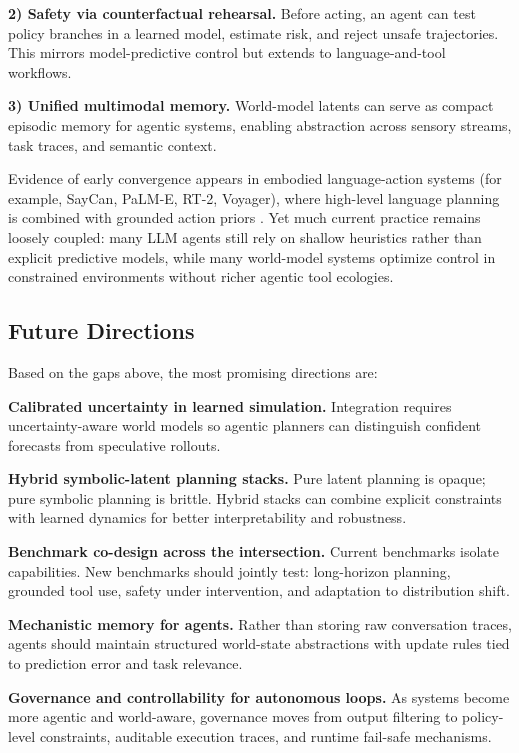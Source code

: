 \documentclass[conference]{IEEEtran}
\begin{document}
\textbf{2) Safety via counterfactual rehearsal.}
Before acting, an agent can test policy branches in a learned model, estimate risk, and reject unsafe trajectories. This mirrors model-predictive control but extends to language-and-tool workflows.

\textbf{3) Unified multimodal memory.}
World-model latents can serve as compact episodic memory for agentic systems, enabling abstraction across sensory streams, task traces, and semantic context.

Evidence of early convergence appears in embodied language-action systems (for example, SayCan, PaLM-E, RT-2, Voyager), where high-level language planning is combined with grounded action priors \cite{ahn2022saycan, driess2023palme, brohan2023rt2, wang2023voyager}. Yet much current practice remains loosely coupled: many LLM agents still rely on shallow heuristics rather than explicit predictive models, while many world-model systems optimize control in constrained environments without richer agentic tool ecologies.

\subsection{Future Directions}
Based on the gaps above, the most promising directions are:

\textbf{Calibrated uncertainty in learned simulation.}
Integration requires uncertainty-aware world models so agentic planners can distinguish confident forecasts from speculative rollouts.

\textbf{Hybrid symbolic-latent planning stacks.}
Pure latent planning is opaque; pure symbolic planning is brittle. Hybrid stacks can combine explicit constraints with learned dynamics for better interpretability and robustness.

\textbf{Benchmark co-design across the intersection.}
Current benchmarks isolate capabilities. New benchmarks should jointly test: long-horizon planning, grounded tool use, safety under intervention, and adaptation to distribution shift.

\textbf{Mechanistic memory for agents.}
Rather than storing raw conversation traces, agents should maintain structured world-state abstractions with update rules tied to prediction error and task relevance.

\textbf{Governance and controllability for autonomous loops.}
As systems become more agentic and world-aware, governance moves from output filtering to policy-level constraints, auditable execution traces, and runtime fail-safe mechanisms.
\end{document}
